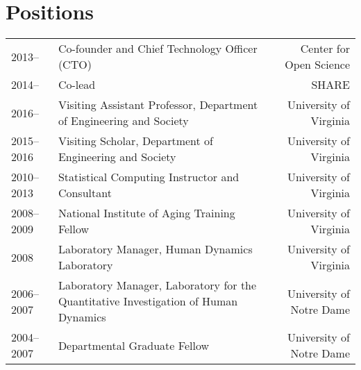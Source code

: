 \documentclass[11pt]{article}
\begin{document}
\maketitle


\section*{Positions}
\begin{tabularx}{\textwidth}{l X r}
2013-- 			& Co-founder and Chief Technology Officer (CTO) & Center for Open Science\\
2014-- 			& Co-lead & SHARE \\
2016--				& Visiting Assistant Professor, Department of Engineering and Society & University of Virginia \\
2015--2016		& Visiting Scholar, Department of Engineering and Society & University of Virginia \\
2010--2013 	& Statistical Computing Instructor and Consultant &  University of Virginia\\
2008--2009 	& National Institute of Aging Training Fellow & University of Virginia\\
2008 				& Laboratory Manager, Human Dynamics Laboratory & University of Virginia\\
2006--2007 	& Laboratory Manager, Laboratory for the Quantitative Investigation of Human Dynamics & University of Notre Dame\\
2004--2007 	& Departmental Graduate Fellow & University of Notre Dame\\
\end{tabularx}
\end{document}
